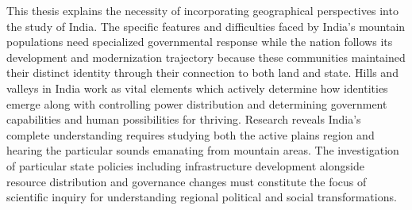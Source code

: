 \begin{sloppypar}
\vspace{0.3cm}

This thesis explains the necessity of incorporating geographical perspectives into the study of India. The specific features and difficulties faced by India's mountain populations need specialized governmental response while the nation follows its development and modernization trajectory because these communities maintained their distinct identity through their  connection to both land and state. Hills and valleys in India work as vital elements which actively determine how identities emerge along with controlling power distribution and determining government capabilities and human possibilities for thriving. Research reveals India's complete understanding requires studying both the active plains region and hearing the particular sounds emanating from mountain areas.  The investigation of particular state policies including infrastructure development alongside resource distribution and governance changes must constitute the focus of scientific inquiry for understanding regional political and social transformations.

\end{sloppypar}